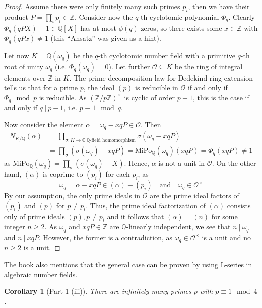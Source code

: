 \documentclass{scrartcl}
\newcommand{\Z}{\mathbb{Z}}
\newcommand{\Q}{\mathbb{Q}}
\newcommand{\C}{\mathbb{C}}
\newcommand{\divides}{\ | \ }
\newcommand{\units}{\times}
\newtheorem{corollary}[definition]{Corollary}
\begin{document}
\begin{proof}
    Assume there were only finitely many such primes $p_i$, then we have their product $P = \prod_i p_i \in \Z$.
    Consider now the $q$-th cyclotomic polynomial $\Phi_q$.
    Clearly $\Phi_q(qPX) - 1 \in \Q[X]$ has at most $\phi(q)$ zeros, so there exists some $x \in \Z$ with $\Phi_q(qPx) \neq 1$ (this ``Ansatz'' was given as a hint).

    Let now $K = \Q(\omega_q)$ be the $q$-th cyclotomic number field with a primitive $q$-th root of unity $\omega_q$ (i.e. $\Phi_q(\omega_q) = 0$).
    Let further $\mathcal{O} \subseteq K$ be the ring of integral elements over $\Z$ in $K$.
    The prime decomposition law for Dedekind ring extension \cite[Chapter I, Prop 8.3]{neukirch} tells us that for a prime $p$, the ideal $(p)$ is reducible in $\mathcal{O}$ if and only if $\Phi_q \mod p$ is reducible.
    As $(\Z/p\Z)^\units$ is cyclic of order $p - 1$, this is the case if and only if $q \divides p - 1$, i.e. $p \equiv 1 \mod q$.

    Now consider the element $\alpha = \omega_q - xqP \in \mathcal{O}$. Then
    \begin{align*}
        N_{K/\Q}(\alpha) &= \prod_{\sigma: K \to \C \ \text{$\Q$-field homomorphism}} \sigma(\omega_q - xqP) \\
        &= \prod_{\sigma} (\sigma(\omega_q) - xqP) = \mathrm{MiPo}_\Q(\omega_q)(xqP) = \Phi_q(xqP) \neq 1
    \end{align*}
    as $\mathrm{MiPo}_\Q(\omega_q) = \prod_\sigma (\sigma(\omega_q) - X)$.
    Hence, $\alpha$ is not a unit in $\mathcal{O}$.
    On the other hand, $(\alpha)$ is coprime to $(p_i)$ for each $p_i$, as 
    \begin{equation*}
        \omega_q = \alpha - xqP \in (\alpha) + (p_i) \quad \text{and} \quad \omega_q \in \mathcal{O}^\units
    \end{equation*}
    By our assumption, the only prime ideals in $\mathcal{O}$ are the prime ideal factors of $(p_i)$ and $(p)$ for $p \neq p_i$.
    Thus, the prime ideal factorization of $(\alpha)$ consists only of prime ideals $(p), p \neq p_i$ and it follows that $(\alpha) = (n)$ for some integer $n \geq 2$.
    As $\omega_q$ and $xqP \in \Z$ are $\Q$-linearly independent, we see that $n \divides \omega_q$ and $n \divides xqP$.
    However, the former is a contradiction, as $\omega_q \in \mathcal{O}^\units$ is a unit and no $n \geq 2$ is a unit.
\end{proof}
The book also mentions that the general case can be proven by using L-series in algebraic number fields.
\begin{corollary}[Part 1 (iii)]
    There are infinitely many primes $p$ with $p \equiv 1 \mod 4$.
\end{corollary}

\printbibliography
\end{document}
